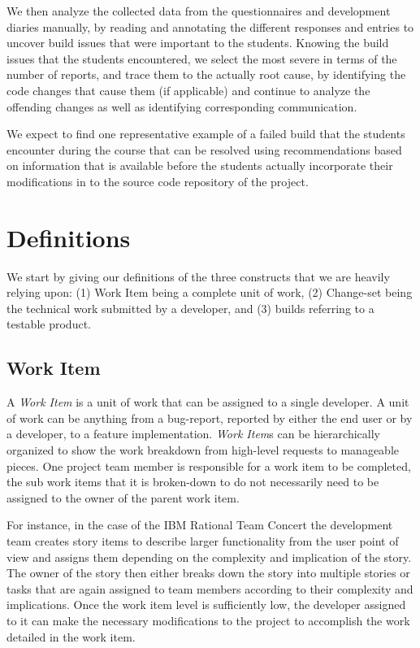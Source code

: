 We then analyze the collected data from the questionnaires and development diaries manually, by reading and annotating the different responses and entries to uncover build issues that were important to the students.
Knowing the build issues that the students encountered, we select the most severe in terms of the number of reports, and trace them to the actually root cause, by identifying the code changes that cause them (if applicable) and continue to analyze the offending changes as well as identifying corresponding communication.

We expect to find one representative example of a failed build that the students encounter during the course that can be resolved using recommendations based on information that is available before the students actually incorporate their modifications in to the source code repository of the project.

\section{Definitions}
\label{c5:sec:definitions}
We start by giving our definitions of the three constructs that we are heavily relying upon: (1) Work Item being a complete unit of work, (2) Change-set being the technical work submitted by a developer, and (3) builds referring to a testable product.

\subsection{Work Item}
A \emph{Work Item} is a unit of work that can be assigned to a single developer.
A unit of work can be anything from a bug-report, reported by either the end user or by a developer, to a feature implementation.
\emph{Work Item}s can be hierarchically organized to show the work breakdown from high-level requests to manageable pieces.
One project team member is responsible for a work item to be completed, the sub work items that it is broken-down to do not necessarily need to be assigned to the owner of the parent work item.

For instance, in the case of the IBM Rational Team Concert the development team creates story items to describe larger functionality from the user point of view and assigns them depending on the complexity and implication of the story.
The owner of the story then either breaks down the story into multiple stories or tasks that are again assigned to team members according to their complexity and implications.
Once the work item level is sufficiently low, the developer assigned to it can make the necessary modifications to the project to accomplish the work detailed in the work item.

